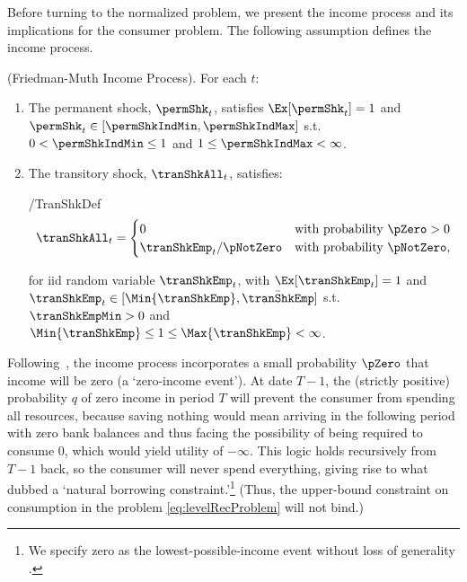 \documentclass[BufferStockTheory]{subfiles}
\begin{document}
Before turning to the normalized problem, we present the income process and its implications for the consumer problem.
The following assumption defines the income process.

\begin{assumI}\label{ass:shocks}(Friedman-Muth Income Process).
For each $t$:
\begin{enumerate}
\item The permanent shock, $\permShk_{t}$, satisfies $\Ex[{\permShk}_{t}]=1$ and  $\permShk_{t}\in [\permShkIndMin,\permShkIndMax]$ s.t. $0 < \permShkIndMin \leq 1$ and $1 \leq \permShkIndMax < \infty$. 
\item The transitory shock, $\tranShkAll_{t}$, satisfies: 
\begin{verbatimwrite}{\EqDir/TranShkDef}
  \begin{equation}
    \tranShkAll_{t}=
    \begin{cases}
      0\phantom{_{t+1}/\pNotZero} & \text{with probability $\pZero > 0$} \\
      \tranShkEmp_{t}/\pNotZero      & \text{with probability $\pNotZero  $}, %
    \end{cases} \label{eq:TranShkDef}
  \end{equation}
\end{verbatimwrite}\unskip

\noindent for iid random variable $\tranShkEmp_{t}$,  with $\Ex[{\tranShkEmp}_{t}]=1$ and $ \tranShkEmp_{t} \in [\Min{\tranShkEmp}, \bar{\tranShkEmp}]$ s.t.
$\tranShkEmpMin >0$ and $\Min{\tranShkEmp} \leq 1 \leq \Max{\tranShkEmp} < \infty$.

\end{enumerate} 
\end{assumI}

Following~\cite{zeldesStochastic}, the income process incorporates a small probability $\pZero$ that income will be zero (a `zero-income event').
At date $T-1$, the (strictly positive) probability $q$ of zero income in period $T$ will prevent the consumer from spending all resources, because saving nothing would mean arriving in the following period with zero bank balances and thus facing the possibility of being required to consume 0, which would yield utility of $-\infty$.
This logic holds recursively from $T-1$ back, so  the consumer will never spend everything, giving rise to what \cite{aiyagari:ge} dubbed a `natural borrowing constraint.'\footnote{We specify zero as the lowest-possible-income event without loss of generality \citep{aiyagari:ge}.} (Thus, the upper-bound constraint on consumption in the problem \eqref{eq:levelRecProblem} will not bind.)
\end{document}
